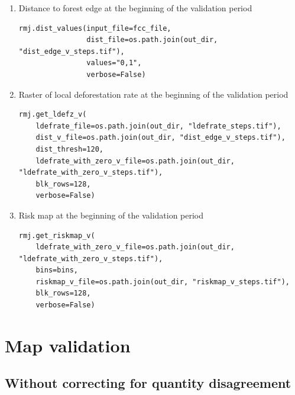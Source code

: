 \documentclass[paper=a4, 12pt, DIV=12]{scrartcl}
\begin{document}
\begin{enumerate}
\item Distance to forest edge at the beginning of the validation period
\label{sec:orgca6a48d}

\begin{verbatim}
rmj.dist_values(input_file=fcc_file,
                dist_file=os.path.join(out_dir, "dist_edge_v_steps.tif"),
                values="0,1",
                verbose=False)
\end{verbatim}

\item Raster of local deforestation rate at the beginning of the validation period
\label{sec:org07944a6}

\begin{verbatim}
rmj.get_ldefz_v(
    ldefrate_file=os.path.join(out_dir, "ldefrate_steps.tif"),
    dist_v_file=os.path.join(out_dir, "dist_edge_v_steps.tif"),
    dist_thresh=120,
    ldefrate_with_zero_v_file=os.path.join(out_dir, "ldefrate_with_zero_v_steps.tif"),
    blk_rows=128,
    verbose=False)
\end{verbatim}

\item Risk map at the beginning of the validation period
\label{sec:org998fb7f}

\begin{verbatim}
rmj.get_riskmap_v(
    ldefrate_with_zero_v_file=os.path.join(out_dir, "ldefrate_with_zero_v_steps.tif"),
    bins=bins,  
    riskmap_v_file=os.path.join(out_dir, "riskmap_v_steps.tif"),
    blk_rows=128,
    verbose=False)
\end{verbatim}
\end{enumerate}


\section{Map validation}
\label{sec:org4aec4b3}

\subsection{Without correcting for quantity disagreement}
\label{sec:org43f2fff}
\end{document}
